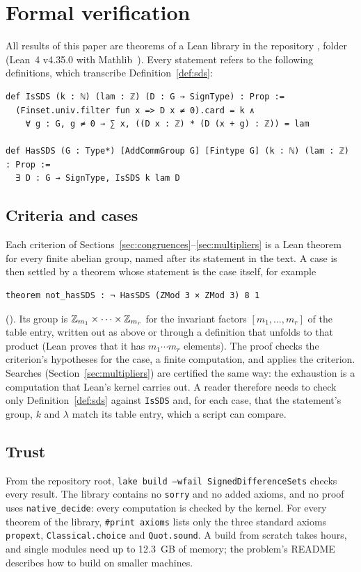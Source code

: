 \section{Formal verification}\label{sec:verification}

All results of this paper are theorems of a Lean library in the repository \repo, folder
 (Lean~4 v4.35.0 with Mathlib~\cite{lean4,mathlib}).
Every statement refers to the following definitions, which transcribe
Definition~\ref{def:sds}:

\begin{Verbatim}[fontsize=\small]
def IsSDS (k : ℕ) (lam : ℤ) (D : G → SignType) : Prop :=
  (Finset.univ.filter fun x => D x ≠ 0).card = k ∧
    ∀ g : G, g ≠ 0 → ∑ x, ((D x : ℤ) * (D (x + g) : ℤ)) = lam

def HasSDS (G : Type*) [AddCommGroup G] [Fintype G] (k : ℕ) (lam : ℤ) : Prop :=
  ∃ D : G → SignType, IsSDS k lam D
\end{Verbatim}

\subsection*{Criteria and cases}
Each criterion of Sections~\ref{sec:congruences}--\ref{sec:multipliers} is a Lean theorem for
every finite abelian group, named after its statement in the text. A case is then settled by a
theorem whose statement is the case itself, for example
\begin{Verbatim}[fontsize=\small]
theorem not_hasSDS : ¬ HasSDS (ZMod 3 × ZMod 3) 8 1
\end{Verbatim}
(). Its group is
$\mathbb{Z}_{m_1} \times \cdots \times \mathbb{Z}_{m_r}$ for the invariant factors $[m_1,\dots,m_r]$ of the
table entry, written out as above or through a definition  that unfolds to that
product (Lean proves that it has $m_1 \cdots m_r$ elements). The proof checks the criterion's
hypotheses for the case, a finite computation, and applies the criterion. Searches
(Section~\ref{sec:multipliers}) are certified the same way: the exhaustion is a computation
that Lean's kernel carries out. A reader therefore needs to check only
Definition~\ref{def:sds} against \texttt{IsSDS} and, for each case, that the statement's group,
$k$ and $\lambda$ match its table entry, which a script can compare.

\subsection*{Trust}
From the repository root, \texttt{lake build --wfail SignedDifferenceSets} checks every result.
The library contains no \texttt{sorry} and no added axioms, and no proof uses
\texttt{native\_decide}: every computation is checked by the kernel. For every theorem of the
library, \texttt{\#print axioms} lists only the three standard axioms \texttt{propext},
\texttt{Classical.choice} and \texttt{Quot.sound}. A build from scratch takes hours, and single
modules need up to 12.3~GB of memory; the problem's README describes how to build on smaller
machines.

